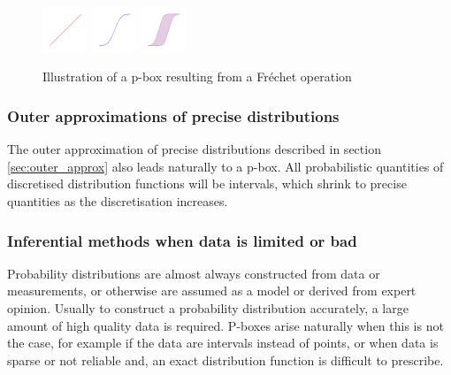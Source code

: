 \documentclass{juliacon}
\begin{document}
\begin{figure}[htp]

  \centering
  \includegraphics[width=0.12\textwidth]{../examples/JuliaCon/fig5/fig5_dist1.pdf}
  \includegraphics[width=0.12\textwidth]{../examples/JuliaCon/fig5/fig5_dist2.pdf}
  \raisebox{9.0mm}{{\Large$\rightarrow$}}
  \includegraphics[width=0.12\textwidth]{../examples/JuliaCon/fig5/fig5_pbox.pdf}
  

  \caption{Illustration of a p-box resulting from a Fréchet operation}
  \label{fig:figure5}
  
\end{figure}


\subsubsection{Outer approximations of precise distributions} \hfill \break

The outer approximation of precise distributions described in section \ref{sec:outer_approx} also leads naturally to a p-box. All probabilistic quantities of discretised distribution functions will be intervals, which shrink to precise quantities as the discretisation increases.

\subsubsection{Inferential methods when data is limited or bad} \hfill \break

Probability distributions are almost always constructed from data or measurements, or otherwise are assumed as a model or derived from expert opinion. Usually to construct a probability distribution accurately, a large amount of high quality data is required. P-boxes arise naturally when this is not the case, for example if the data are intervals instead of points, or when data is sparse or not reliable and, an exact distribution function is difficult to prescribe.
\end{document}
